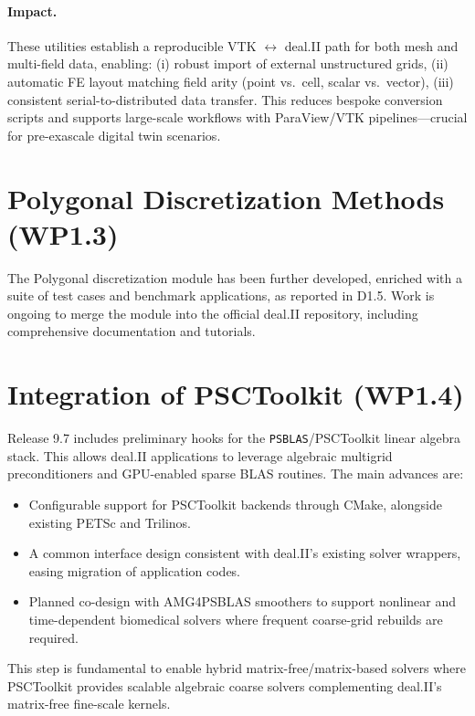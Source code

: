\documentclass[a4paper,12pt]{article}
\begin{document}
\paragraph{Impact.} These utilities establish a reproducible VTK $\leftrightarrow$
deal.II path for both mesh and multi-field data, enabling:
(i) robust import of external unstructured grids,
(ii) automatic FE layout matching field arity (point vs.\ cell, scalar vs.\ vector),
(iii) consistent serial-to-distributed data transfer.
This reduces bespoke conversion scripts and supports large-scale workflows with
ParaView/VTK pipelines—crucial for pre-exascale digital twin scenarios.


\section{Polygonal Discretization Methods (WP1.3)}

The Polygonal discretization module has been further developed, enriched with a suite of test cases and benchmark applications, as reported in D1.5. Work is ongoing to merge the module into the official deal.II repository, including comprehensive documentation and tutorials.

\section{Integration of PSCToolkit (WP1.4)}

Release 9.7 includes preliminary hooks for the \texttt{PSBLAS}/PSCToolkit
linear algebra stack. This allows deal.II applications to leverage algebraic
multigrid preconditioners and GPU-enabled sparse BLAS routines. The main
advances are:

\begin{itemize}
  \item Configurable support for PSCToolkit backends through CMake, alongside
        existing PETSc and Trilinos.
  \item A common interface design consistent with deal.II’s existing solver
        wrappers, easing migration of application codes.
  \item Planned co-design with AMG4PSBLAS smoothers to support nonlinear and
        time-dependent biomedical solvers where frequent coarse-grid rebuilds
        are required.
\end{itemize}

This step is fundamental to enable hybrid matrix-free/matrix-based solvers
where PSCToolkit provides scalable algebraic coarse solvers complementing
deal.II’s matrix-free fine-scale kernels.
\end{document}
